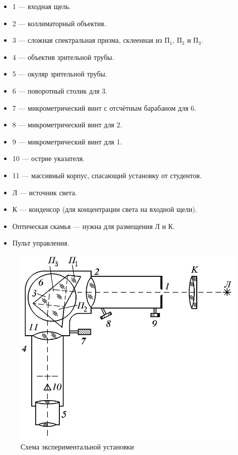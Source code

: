 \documentclass[a4paper, 12pt]{article}
\begin{document}
\begin{itemize}
    \item 1 --- входная щель.
    \item 2 --- коллиматорный объектив.
    \item 3 --- сложная спектральная призма, склеенная из $П_1$, $П_2$ и $П_3$.
    \item 4 --- объектив зрительной трубы.
    \item 5 --- окуляр зрительной трубы.
    \item 6 --- поворотный столик для 3.
    \item 7 --- микрометрический винт с отсчётным барабаном для 6.
    \item 8 --- микрометрический винт для 2.
    \item 9 --- микрометрический винт для 1.
    \item 10 --- острие указателя.
    \item 11 --- массивный корпус, спасающий установку от студентов.
    \item Л --- источник света.
    \item К --- конденсор (для концентрации света на входной щели).
    \item Оптическая скамья --- нужна для размещения Л и К.
    \item Пульт управления.
\end{itemize}

\begin{figure}[H]
    \includegraphics[scale = 0.4]{Workplace}
    \centering
    \caption{Схема экспериментальной установки}
    \label{img:work}
\end{figure}
\end{document}
